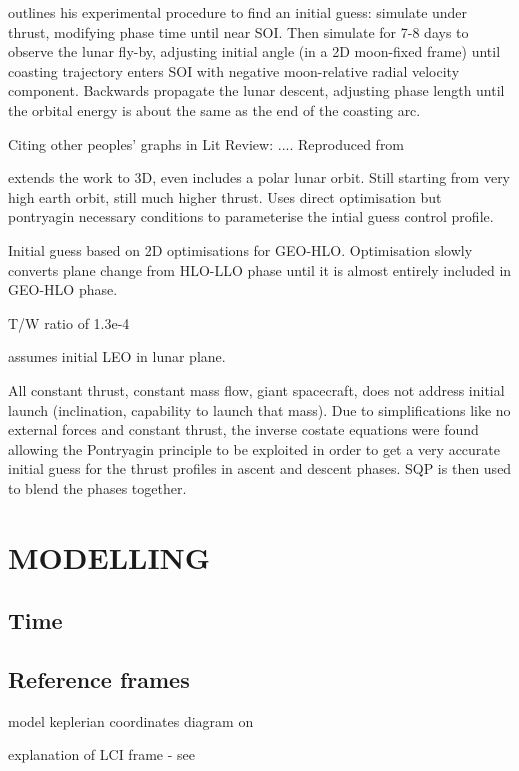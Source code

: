 \textcite{Kluever1996} outlines his experimental procedure to find an initial guess: simulate under thrust, modifying phase time until near SOI. Then simulate for 7-8 days to observe the lunar fly-by, adjusting initial angle (in a 2D moon-fixed frame) until coasting trajectory enters SOI with negative moon-relative radial velocity component. Backwards propagate the lunar descent, adjusting phase length until the orbital energy is about the same as the end of the coasting arc.

Citing other peoples' graphs in Lit Review: .... Reproduced from \cite{}

\textcite{Kluever1997} extends the work to 3D, even includes a polar lunar orbit. Still starting from very high earth orbit, still much higher thrust. Uses direct optimisation but pontryagin necessary conditions to parameterise the intial guess control profile.

Initial guess based on 2D optimisations for GEO-HLO. Optimisation slowly converts plane change from HLO-LLO phase  until it is almost entirely included in GEO-HLO phase.

T/W ratio of 1.3e-4

\textcite{Kluever1995} assumes initial LEO in lunar plane.

All constant thrust, constant mass flow, giant spacecraft, does not address initial launch (inclination, capability to launch that mass). Due to simplifications like no external forces and constant thrust, the inverse costate equations were found allowing the Pontryagin principle to be exploited in order to get a very accurate initial guess for the thrust profiles in ascent and descent phases. SQP is then used to blend the phases together.

\section{MODELLING}
\subsection{Time}
\subsection{Reference frames}
model keplerian coordinates diagram on \cite{Pollard2000}

explanation of LCI frame - see \cite{Erb_thesis}

